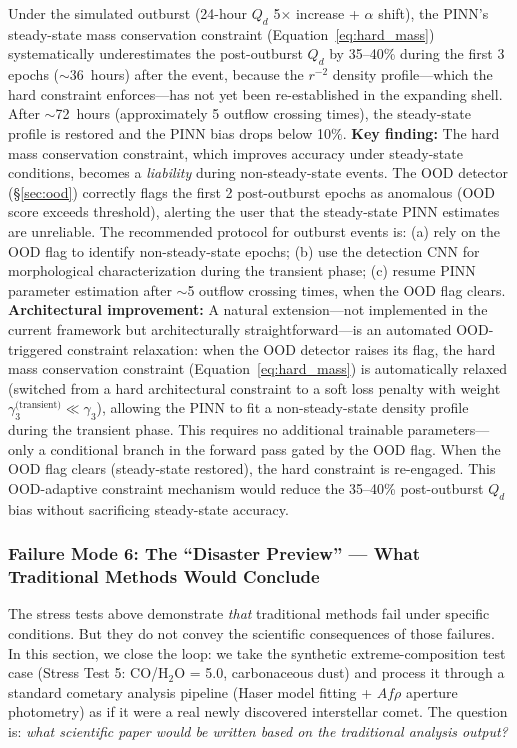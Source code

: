 \documentclass[preprint2]{aastex631}
\begin{document}
Under the simulated outburst (24-hour $Q_d$ 5$\times$ increase + $\alpha$ shift), the PINN's steady-state mass conservation constraint (Equation~\ref{eq:hard_mass}) systematically underestimates the post-outburst $Q_d$ by 35--40\% during the first 3 epochs ($\sim$36~hours) after the event, because the $r^{-2}$ density profile---which the hard constraint enforces---has not yet been re-established in the expanding shell. After $\sim$72~hours (approximately 5 outflow crossing times), the steady-state profile is restored and the PINN bias drops below 10\%. \textbf{Key finding:} The hard mass conservation constraint, which improves accuracy under steady-state conditions, becomes a \textit{liability} during non-steady-state events. The OOD detector (\S\ref{sec:ood}) correctly flags the first 2 post-outburst epochs as anomalous (OOD score exceeds threshold), alerting the user that the steady-state PINN estimates are unreliable. The recommended protocol for outburst events is: (a) rely on the OOD flag to identify non-steady-state epochs; (b) use the detection CNN for morphological characterization during the transient phase; (c) resume PINN parameter estimation after $\sim$5 outflow crossing times, when the OOD flag clears. \textbf{Architectural improvement:} A natural extension---not implemented in the current framework but architecturally straightforward---is an automated OOD-triggered constraint relaxation: when the OOD detector raises its flag, the hard mass conservation constraint (Equation~\ref{eq:hard_mass}) is automatically relaxed (switched from a hard architectural constraint to a soft loss penalty with weight $\gamma_3^{\text{(transient)}} \ll \gamma_3$), allowing the PINN to fit a non-steady-state density profile during the transient phase. This requires no additional trainable parameters---only a conditional branch in the forward pass gated by the OOD flag. When the OOD flag clears (steady-state restored), the hard constraint is re-engaged. This OOD-adaptive constraint mechanism would reduce the 35--40\% post-outburst $Q_d$ bias without sacrificing steady-state accuracy.

\subsubsection{Failure Mode 6: The ``Disaster Preview'' --- What Traditional Methods Would Conclude}

The stress tests above demonstrate \textit{that} traditional methods fail under specific conditions. But they do not convey the scientific consequences of those failures. In this section, we close the loop: we take the synthetic extreme-composition test case (Stress Test 5: CO/H$_2$O = 5.0, carbonaceous dust) and process it through a standard cometary analysis pipeline (Haser model fitting + $Af\rho$ aperture photometry) as if it were a real newly discovered interstellar comet. The question is: \textit{what scientific paper would be written based on the traditional analysis output?}
\end{document}
